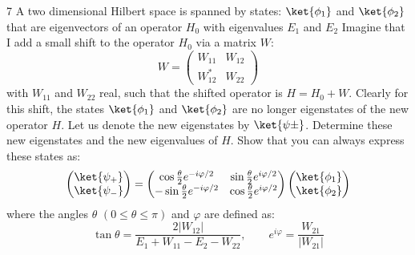 \documentclass[12pt]{article}
\begin{document}
\newpage 
\begin{exc}{7}
    A two dimensional Hilbert space is spanned by states: $\ket{\phi_1}$ and $\ket{\phi_2}$ that are eigenvectors of an operator $H_0$ with eigenvalues $E_1$ and $E_2$ Imagine that I add a small shift to the operator $H_0$ via a matrix $W$:
    \begin{equation}
        W = \begin{pmatrix}
        W_{11} & W_{12} \\ 
        W_{12}^* & W_{22}
    \end{pmatrix}
    \end{equation}
    with $W_{11}$ and $W_{22}$ real, such that the shifted operator is $H = H_0 + W$.
    Clearly for this shift, the states $\ket{\phi_1}$ and $\ket{\phi_2}$ are no longer eigenstates of the new operator $H$. Let us denote the new eigenstates by $\ket{\psi\pm}$. Determine these new eigenstates and the new eigenvalues of $H$. Show that you can always express these states as:
    \begin{equation}
        \begin{pmatrix}
            \ket{\psi_+} \\
            \ket{\psi_-}
        \end{pmatrix}
        = 
        \begin{pmatrix}
            \cos \frac\theta 2 e^{-i\varphi/2} & \sin \frac\theta 2e^{i\varphi/2}\\
            -\sin \frac \theta 2 e^{-i\varphi/2} & \cos\frac \theta 2 e^{i\varphi/2}
        \end{pmatrix}
        \begin{pmatrix}
            \ket{\phi_1}\\
            \ket{\phi_2}
        \end{pmatrix}
    \end{equation}
    where the angles $\theta$ $(0 \leq \theta \leq \pi)$ and $\varphi$ are defined as:
    \begin{equation}
        \tan \theta = \frac{2|W_{12}|}{E_1 + W_{11} - E_2 - W_{22}}, \qquad e^{i\varphi} = \frac{W_{21}}{|W_{21}|}
    \end{equation}
\end{exc}
\end{document}
